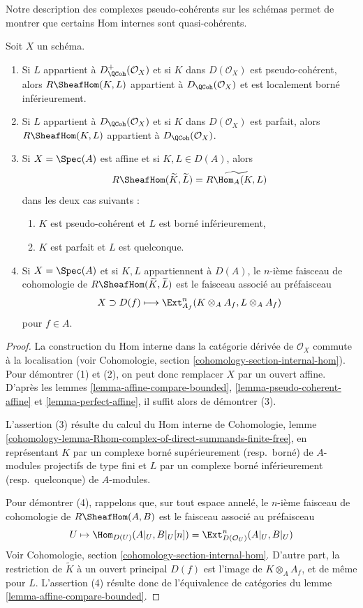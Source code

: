 \noindent
Notre description des complexes pseudo-cohérents
sur les schémas permet de montrer que certains Hom internes
sont quasi-cohérents.

\begin{lemma}
\label{lemma-quasi-coherence-internal-hom}
Soit $X$ un schéma.
\begin{enumerate}
\item Si $L$ appartient à $D^+_\QCoh(\mathcal{O}_X)$ et si
$K$ dans $D(\mathcal{O}_X)$ est pseudo-cohérent, alors
$R\SheafHom(K, L)$ appartient à $D_\QCoh(\mathcal{O}_X)$
et est localement borné inférieurement.
\item Si $L$ appartient à $D_\QCoh(\mathcal{O}_X)$ et si
$K$ dans $D(\mathcal{O}_X)$ est parfait, alors
$R\SheafHom(K, L)$ appartient à $D_\QCoh(\mathcal{O}_X)$.
\item Si $X = \Spec(A)$ est affine et si $K, L \in D(A)$, alors
$$
R\SheafHom(\widetilde{K}, \widetilde{L}) = \widetilde{R\Hom_A(K, L)}
$$
dans les deux cas suivants :
\begin{enumerate}
\item $K$ est pseudo-cohérent et $L$ est borné inférieurement,
\item $K$ est parfait et $L$ est quelconque.
\end{enumerate}
\item Si $X = \Spec(A)$ et si $K, L$ appartiennent à $D(A)$, le $n$-ième
faisceau de cohomologie de $R\SheafHom(\widetilde{K}, \widetilde{L})$
est le faisceau associé au préfaisceau
$$
X \supset D(f) \longmapsto \Ext^n_{A_f}(K \otimes_A A_f, L \otimes_A A_f)
$$
pour $f \in A$.
\end{enumerate}
\end{lemma}

\begin{proof}
La construction du Hom interne dans la catégorie dérivée de
$\mathcal{O}_X$ commute à la localisation (voir
Cohomologie, section \ref{cohomology-section-internal-hom}).
Pour démontrer (1) et (2), on peut donc remplacer $X$ par un ouvert affine.
D'après les lemmes \ref{lemma-affine-compare-bounded},
\ref{lemma-pseudo-coherent-affine} et
\ref{lemma-perfect-affine},
il suffit alors de démontrer (3).

\medskip\noindent
L'assertion (3) résulte du calcul du
Hom interne de Cohomologie, lemme
\ref{cohomology-lemma-Rhom-complex-of-direct-summands-finite-free},
en représentant $K$ par un complexe borné supérieurement (resp.\ borné) de
$A$-modules projectifs de type fini et $L$ par un complexe borné inférieurement
(resp.\ quelconque) de $A$-modules.

\medskip\noindent
Pour démontrer (4), rappelons que, sur tout espace annelé, le $n$-ième faisceau de cohomologie de
$R\SheafHom(A, B)$ est le faisceau associé au préfaisceau
$$
U \mapsto \Hom_{D(U)}(A|_U, B|_U[n]) =
\Ext^n_{D(\mathcal{O}_U)}(A|_U, B|_U)
$$
Voir Cohomologie, section \ref{cohomology-section-internal-hom}.
D'autre part, la restriction de $\widetilde{K}$ à un ouvert principal
$D(f)$ est l'image de $K \otimes_A A_f$, et de même pour $L$.
L'assertion (4) résulte donc de l'équivalence de catégories du
lemme \ref{lemma-affine-compare-bounded}.
\end{proof}

